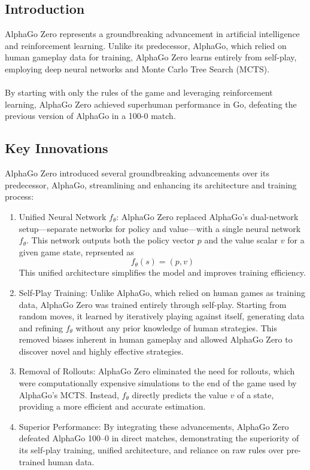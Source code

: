 \subsection{Introduction}
AlphaGo Zero represents a groundbreaking advancement in artificial intelligence and reinforcement learning. Unlike its predecessor, AlphaGo, which relied on human gameplay data for training, AlphaGo Zero learns entirely from self-play, employing deep neural networks and Monte Carlo Tree Search (MCTS). 
\\\\
By starting with only the rules of the game and leveraging reinforcement learning, AlphaGo Zero achieved superhuman performance in Go, defeating the previous version of AlphaGo in a 100-0 match.
\subsection{Key Innovations}

AlphaGo Zero introduced several groundbreaking advancements over its predecessor, AlphaGo, streamlining and enhancing its architecture and training process:

\begin{enumerate}
    \item Unified Neural Network \( f_\theta \):
    AlphaGo Zero replaced AlphaGo's dual-network setup—separate networks for policy and value—with a single neural network \( f_\theta \). This network outputs both the policy vector \( p \) and the value scalar \( v \) for a given game state, reprsented as \[ f_\theta(s) = (p, v) \] This unified architecture simplifies the model and improves training efficiency.

    \item Self-Play Training:
    Unlike AlphaGo, which relied on human games as training data, AlphaGo Zero was trained entirely through self-play. Starting from random moves, it learned by iteratively playing against itself, generating data and refining \( f_\theta \) without any prior knowledge of human strategies. This removed biases inherent in human gameplay and allowed AlphaGo Zero to discover novel and highly effective strategies.

    \item Removal of Rollouts:
    AlphaGo Zero eliminated the need for rollouts, which were computationally expensive simulations to the end of the game used by AlphaGo's MCTS. Instead, \( f_\theta \) directly predicts the value \( v \) of a state, providing a more efficient and accurate estimation.


    \item Superior Performance:
    By integrating these advancements, AlphaGo Zero defeated AlphaGo 100–0 in direct matches, demonstrating the superiority of its self-play training, unified architecture, and reliance on raw rules over pre-trained human data.
\end{enumerate}

